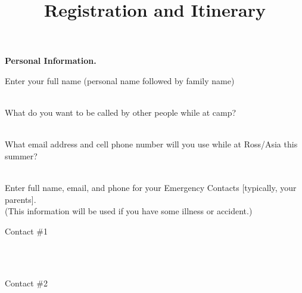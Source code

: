 \documentclass{rossasia}
\title{Registration and Itinerary}
\newcommand{\spz}{\hspace*{5mm}}
\newcommand{\spa}{\hspace*{10mm}}
\begin{document}
\maketitle

{\bf Personal Information.}

Enter your full name (personal name followed by family name)\\[3pt]
\spa  {} \

What do you want to be called by other people while at camp? \\[3pt]
\spa  {} \

What email address and cell phone number will you use while at Ross/Asia this summer?\\[3pt]
\spa  {} \\[8pt]
\spa  {} 

\bigskip\bigskip

Enter full name, email, and phone for your Emergency Contacts [typically, your parents]. \\
{\scriptsize (This information will be used if you have some illness or accident.) }

Contact \#1 \spz   {} 

\spa  {} \\[8pt]
\spa  {} \ \spa\spa  {} 

\bigskip

Contact \#2 \spz   {} \

\spa   {} \\[8pt]
\spa  {} \ \spa\spa  {} 
\end{document}
